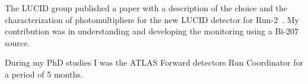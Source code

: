 The LUCID group published a paper with a description of the choice and the characterization of photomultipliers for the new LUCID detector for Run-2~\cite{Alberghi:2016tad}.
My contribution was in understanding and developing the monitoring using a Bi-207 source.

During my PhD studies I was the ATLAS Forward detectors Run Coordinator for a period of 5 months.


% 
%  
% 
%  
%  
